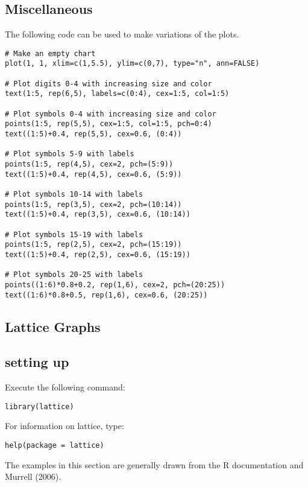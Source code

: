 \subsection{Miscellaneous}
The following code can be used to make variations of the plots.

\begin{framed}
\large \begin{verbatim}
# Make an empty chart
plot(1, 1, xlim=c(1,5.5), ylim=c(0,7), type="n", ann=FALSE)

# Plot digits 0-4 with increasing size and color
text(1:5, rep(6,5), labels=c(0:4), cex=1:5, col=1:5)

# Plot symbols 0-4 with increasing size and color
points(1:5, rep(5,5), cex=1:5, col=1:5, pch=0:4)
text((1:5)+0.4, rep(5,5), cex=0.6, (0:4))

# Plot symbols 5-9 with labels
points(1:5, rep(4,5), cex=2, pch=(5:9))
text((1:5)+0.4, rep(4,5), cex=0.6, (5:9))

# Plot symbols 10-14 with labels
points(1:5, rep(3,5), cex=2, pch=(10:14))
text((1:5)+0.4, rep(3,5), cex=0.6, (10:14))

# Plot symbols 15-19 with labels
points(1:5, rep(2,5), cex=2, pch=(15:19))
text((1:5)+0.4, rep(2,5), cex=0.6, (15:19))

# Plot symbols 20-25 with labels
points((1:6)*0.8+0.2, rep(1,6), cex=2, pch=(20:25))
text((1:6)*0.8+0.5, rep(1,6), cex=0.6, (20:25))
\end{verbatim}\large
\end{framed}

\subsection{Lattice Graphs}
\subsection{setting up}
Execute the following command:
\begin{framed}
\begin{verbatim}
library(lattice)
\end{verbatim}
\end{framed}
For information on lattice, type:
\begin{framed}
\begin{verbatim}
help(package = lattice)
\end{verbatim}
\end{framed}
The examples in this section are generally drawn from the R documentation and Murrell (2006).

